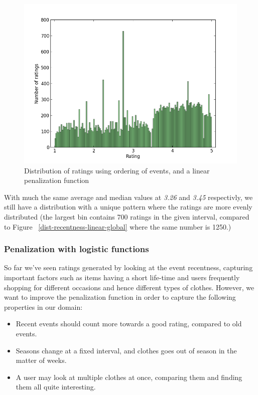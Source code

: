 \begin{figure}[H]
  \centering
  \includegraphics[scale=0.6]{image/dist-count-linear}
  \caption{Distribution of ratings using ordering of events, and a linear
 penalization function}
  \label{fig:dist-count-linear}
\end{figure}

With much the same average and median values at \textit{3.26} and \textit{3.45}
respectivly, we still have a distribution with a unique pattern where the
ratings are more evenly distributed (the largest bin contains 700 ratings in
the given interval, compared to Figure ~\ref{dist-recentness-linear-global}
where the same number is 1250.)

\subsubsection{Penalization with logistic functions}

So far we've seen ratings generated by looking at the event recentness,
capturing important factors such as items having a short life-time and users
frequently shopping for different occasions and hence different types of
clothes. However, we want to improve the penalization function in order to
capture the following properties in our domain:

\begin{itemize}
  \item Recent events should count more towards a good rating, compared to old
  events.
  \item Seasons change at a fixed interval, and clothes goes out of season in
  the matter of weeks.
  \item A user may look at multiple clothes at once, comparing them and finding
  them all quite interesting.
\end{itemize}

